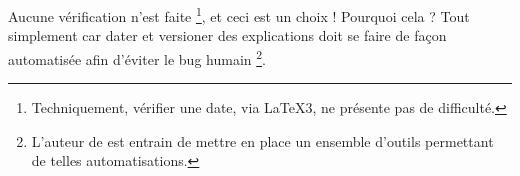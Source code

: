 \begin{bdocwarning}
	Aucune vérification n'est faite
	\footnote{
		Techniquement, vérifier une date, via \LaTeX3, ne présente pas de difficulté.
	},
	et ceci est un choix ! Pourquoi cela ? Tout simplement car dater et versioner des explications doit se faire de façon automatisée afin d'éviter le bug humain
	\footnote{
		L'auteur de  est entrain de mettre en place un ensemble d'outils permettant de telles automatisations.
	}.
\end{bdocwarning}


